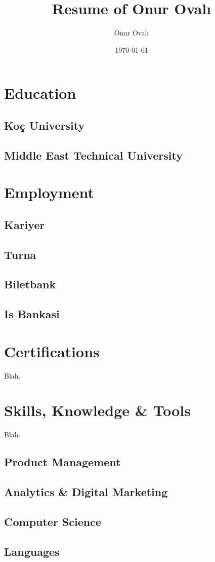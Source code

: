 \documentclass[11pt,twoside,a4paper]{article}
\title{Resume of Onur Ovalı}
\author{Onur Ovalı}
\date{\today}
\begin{document}
  \maketitle

  \section{Education}
    \subsection{Koç University}
    \subsection{Middle East Technical University}

  \section{Employment}
    \subsection{Kariyer}
    \subsection{Turna}
    \subsection{Biletbank}
    \subsection{Is Bankasi}

  \section{Certifications}
  Blah.

  \section{Skills, Knowledge \& Tools}
  Blah.
    \subsection{Product Management}
    \subsection{Analytics \& Digital Marketing}
    \subsection{Computer Science}
    \subsection{Languages}
\end{document}
